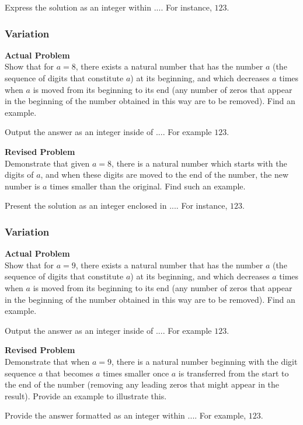Express the solution as an integer within \(\boxed{...}\). For instance, \(\boxed{123}\).

\subsubsection{Variation}
\textbf{Actual Problem}\\
Show that for $a=8$, there exists a natural number that has the number $a$ (the sequence of digits that constitute $a$) at its beginning, and which decreases $a$ times when $a$ is moved from its beginning to its end (any number of zeros that appear in the beginning of the number obtained in this way are to be removed). Find an example.

Output the answer as an integer inside of $\boxed{...}$. For example $\boxed{123}$.

\textbf{Revised Problem}\\
Demonstrate that given $a=8$, there is a natural number which starts with the digits of $a$, and when these digits are moved to the end of the number, the new number is $a$ times smaller than the original. Find such an example.

Present the solution as an integer enclosed in $\boxed{...}$. For instance, $\boxed{123}$.

\subsubsection{Variation}
\textbf{Actual Problem}\\
Show that for $a=9$, there exists a natural number that has the number $a$ (the sequence of digits that constitute $a$) at its beginning, and which decreases $a$ times when $a$ is moved from its beginning to its end (any number of zeros that appear in the beginning of the number obtained in this way are to be removed). Find an example.

Output the answer as an integer inside of $\boxed{...}$. For example $\boxed{123}$.

\textbf{Revised Problem}\\
Demonstrate that when $a=9$, there is a natural number beginning with the digit sequence $a$ that becomes $a$ times smaller once $a$ is transferred from the start to the end of the number (removing any leading zeros that might appear in the result). Provide an example to illustrate this.

Provide the answer formatted as an integer within $\boxed{...}$. For example, $\boxed{123}$.

